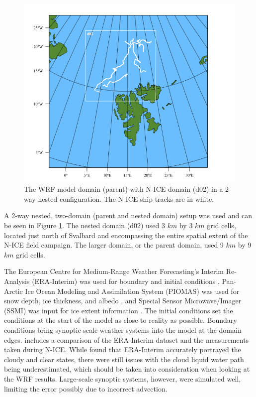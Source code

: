 \begin{figure}[h]
    \centering
    \includegraphics[width=1\linewidth]{figures/chapter3/wrf_domain.png}
    \caption[WRF Model Domain]{The WRF model domain (parent) with N-ICE domain (d02) in a 2-way nested configuration. The N-ICE ship tracks are in white.}
    \label{fig:wrf_domain}
\end{figure}

A 2-way nested, two-domain (parent and nested domain) setup was used and can be seen in Figure \ref{fig:wrf_domain}. The nested domain (d02) used 3 $km$ by 3 $km$ grid cells, located just north of Svalbard and encompassing the entire spatial extent of the N-ICE field campaign. The larger domain, or the parent domain, used 9 $km$ by 9 $km$ grid cells. 

The European Centre for Medium-Range Weather Forecasting’s Interim Re-Analysis (ERA-Interim) was used for boundary and initial conditions \citep{dee:2011}, Pan-Arctic Ice Ocean Modeling and Assimilation System (PIOMAS) was used for snow depth, ice thickness, and albedo \citep{PIOMASS}, and Special Sensor Microwave/Imager (SSMI) was input for ice extent information \citep{SSMI, schweiger:2011}. The initial conditions set the conditions at the start of the model as close to reality as possible. Boundary conditions bring synoptic-scale weather systems into the model at the domain edges. \citet{graham:2017} includes a comparison of the ERA-Interim dataset and the measurements taken during N-ICE. While \citet{graham:2017} found that ERA-Interim accurately portrayed the cloudy and clear states, there were still issues with the cloud liquid water path being underestimated, which should be taken into consideration when looking at the WRF results. Large-scale synoptic systems, however, were simulated well, limiting the error possibly due to incorrect advection.

